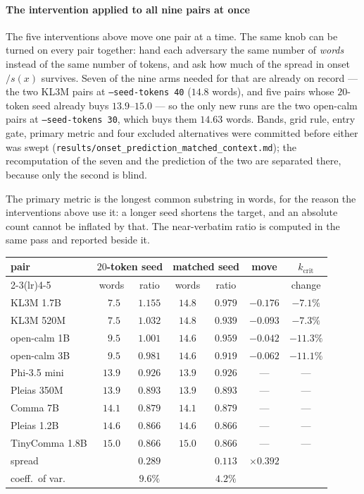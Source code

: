 \paragraph{The intervention applied to all nine pairs at once}
The five interventions above move one pair at a time. The same knob can be turned on every pair
together: hand each adversary the same number of \emph{words} instead of the same number of tokens,
and ask how much of the spread in onset$/s(x)$ survives. Seven of the nine arms needed for that are
already on record --- the two KL3M pairs at \texttt{--seed-tokens 40} ($14.8$ words), and five pairs
whose $20$-token seed already buys $13.9$--$15.0$ --- so the only new runs are the two open-calm
pairs at \texttt{--seed-tokens 30}, which buys them $14.63$ words. Bands, grid rule, entry gate,
primary metric and four excluded alternatives were committed before either was swept
(\texttt{results/onset\_prediction\_matched\_context.md}); the recomputation of the seven and the
prediction of the two are separated there, because only the second is blind.

The primary metric is the longest common substring in words, for the reason the interventions above
use it: a longer seed shortens the target, and an absolute count cannot be inflated by that. The
near-verbatim ratio is computed in the same pass and reported beside it.

\begin{center}\footnotesize
\setlength{\tabcolsep}{5pt}
\begin{tabular}{@{}lcccccc@{}}
\toprule
pair & \multicolumn{2}{c}{$20$-token seed} & \multicolumn{2}{c}{matched seed} & move & $k_{\mathrm{crit}}$ \\
\cmidrule(lr){2-3}\cmidrule(lr){4-5}
 & words & ratio & words & ratio & & change \\
\midrule
KL3M 1.7B      & $\phantom{0}7.5$ & $1.155$ & $14.8$ & $0.979$ & $-0.176$ & $-7.1\%$ \\
KL3M 520M      & $\phantom{0}7.5$ & $1.032$ & $14.8$ & $0.939$ & $-0.093$ & $-7.3\%$ \\
open-calm 1B   & $\phantom{0}9.5$ & $1.001$ & $14.6$ & $0.959$ & $-0.042$ & $-11.3\%$ \\
open-calm 3B   & $\phantom{0}9.5$ & $0.981$ & $14.6$ & $0.919$ & $-0.062$ & $-11.1\%$ \\
\midrule
Phi-3.5 mini   & $13.9$ & $0.926$ & $13.9$ & $0.926$ & --- & --- \\
Pleias 350M    & $13.9$ & $0.893$ & $13.9$ & $0.893$ & --- & --- \\
Comma 7B       & $14.1$ & $0.879$ & $14.1$ & $0.879$ & --- & --- \\
Pleias 1.2B    & $14.6$ & $0.866$ & $14.6$ & $0.866$ & --- & --- \\
TinyComma 1.8B & $15.0$ & $0.866$ & $15.0$ & $0.866$ & --- & --- \\
\midrule
spread         & & $0.289$ & & $0.113$ & $\times 0.392$ & \\
coeff.\ of var.& & $9.6\%$ & & $4.2\%$ & & \\
\bottomrule
\end{tabular}
\end{center}

